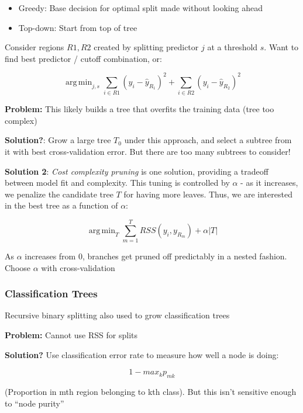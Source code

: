 \documentclass{article}
\DeclareMathOperator*{\argmin}{arg\,min}
\begin{document}
\begin{itemize}
	\item Greedy: Base decision for optimal split made without looking ahead
	\item Top-down: Start from top of tree
\end{itemize}

Consider regions $R1, R2$ created by splitting predictor $j$ at a threshold $s$. Want to find best predictor / cutoff combination, or:

\begin{equation*}
	\argmin_{j, s} \sum_{i \in R1} (y_i - \hat{y}_{R_1})^2 + \sum_{i \in R2} (y_i - \hat{y}_{R_2})^2
\end{equation*}

\textbf{Problem:} This likely builds a tree that overfits the training data (tree too complex)

\textbf{Solution?}: Grow a large tree $T_0$ under this approach, and select a subtree from it with best cross-validation error. But there are too many subtrees to consider!

\textbf{Solution 2}: \textit{Cost complexity pruning} is one solution, providing a tradeoff between model fit and complexity. This tuning is controlled by $\alpha$ - as it increases, we penalize the candidate tree $T$ for having more leaves. Thus, we are interested in the best tree as a function of $\alpha$:

\begin{equation*}
	\argmin_T \sum_{m=1}^T RSS(y_i, y_{R_m}) + \alpha |T|
\end{equation*}

As $\alpha$ increases from 0, branches get pruned off predictably in a nested fashion. Choose $\alpha$ with cross-validation


\subsubsection{Classification Trees}

Recursive binary splitting also used to grow classification trees

\textbf{Problem:} Cannot use RSS for splits

\textbf{Solution?} Use classification error rate to measure how well a node is doing:

\begin{equation*}
	1 - max_k p_{mk}
\end{equation*}

(Proportion in mth region belonging to kth class). But this isn't sensitive enough to ``node purity''
\end{document}
